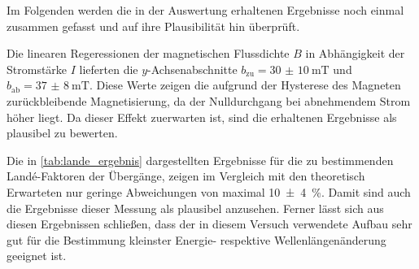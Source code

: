 Im Folgenden werden die in der Auswertung erhaltenen Ergebnisse
noch einmal zusammen gefasst und auf ihre Plausibilität hin überprüft.

Die linearen Regeressionen der magnetischen Flussdichte
$B$ in Abhängigkeit der Stromstärke $I$ lieferten die $y$-Achsenabschnitte
$b_{\mathrm{zu}} = \SI{30(10)}{\milli\tesla}$ und $b_{\mathrm{ab}} = \SI{37(8)}{\milli\tesla}$.
Diese Werte zeigen die aufgrund der Hysterese des Magneten zurückbleibende Magnetisierung,
da der Nulldurchgang bei abnehmendem Strom höher liegt. Da dieser Effekt zuerwarten ist,
sind die erhaltenen Ergebnisse als plausibel zu bewerten.

Die in \cref{tab:lande_ergebnis} dargestellten Ergebnisse für die zu bestimmenden
Landé-Faktoren der Übergänge, zeigen im  Vergleich mit den theoretisch Erwarteten
nur geringe Abweichungen von maximal \SI{10(4)}{\percent}. Damit sind auch die
Ergebnisse dieser Messung als plausibel anzusehen.
Ferner lässt sich aus diesen Ergebnissen schließen, dass der in diesem Versuch
verwendete Aufbau sehr gut für die Bestimmung kleinster Energie- respektive
Wellenlängenänderung geeignet ist.
